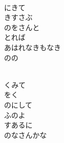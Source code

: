 \documentclass[10pt,b5j]{tarticle} %
\begin{document}
\begin{enumerate}
\begin{minipage}[c]{\blocksize}
    \end{minipage}
    \begin{minipage}[c]{\blocksize}
        
        \vspace{\linespace}
        \item~\\
        にきて\\
        きすさぶ\\
        のをさんと\\
        とれば\\
        あはれなきもなき\\
        のの
        
    \end{minipage}
    \begin{minipage}[c]{\blocksize}
        
        \vspace{\linespace}
        \item~\\
        くみて\\
        をく\\
        のにして\\
        ふのよ\\
        すあるに\\
        のなさんかな
    
    \end{minipage}
\end{enumerate} %
\end{document}

